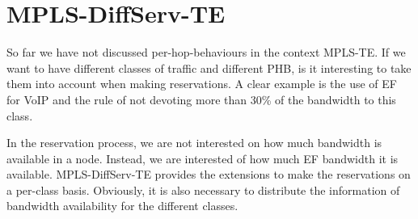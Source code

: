 \section{MPLS-DiffServ-TE}

So far we have not discussed per-hop-behaviours in the context MPLS-TE.  
If we want to have different classes of traffic and different PHB, is it interesting to take them into account when making reservations.
A clear example is the use of EF for VoIP and the rule of not devoting more than 30\% of the bandwidth to this class.

In the reservation process, we are not interested on how much bandwidth is available in a node.
Instead, we are interested of how much EF bandwidth it is available.
MPLS-DiffServ-TE provides the extensions to make the reservations on a per-class basis.
Obviously, it is also necessary to distribute the information of bandwidth availability for the different classes.

